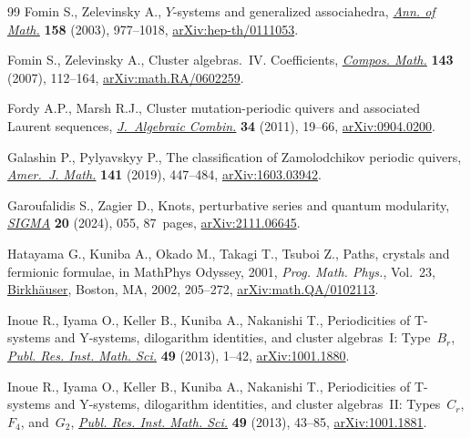 \begin{thebibliography}{99}
Fomin S., Zelevinsky A., {$Y$}-systems and generalized associahedra,
 \href{https://doi.org/10.4007/annals.2003.158.977}{\textit{Ann. of Math.}}
 \textbf{158} (2003), 977--1018,
 \href{http://arxiv.org/abs/hep-th/0111053}{arXiv:hep-th/0111053}.

Fomin S., Zelevinsky A., Cluster algebras.~{IV}. {C}oefficients,
 \href{https://doi.org/10.1112/S0010437X06002521}{\textit{Compos. Math.}}
 \textbf{143} (2007), 112--164,
 \href{http://arxiv.org/abs/math.RA/0602259}{arXiv:math.RA/0602259}.

Fordy A.P., Marsh R.J., Cluster mutation-periodic quivers and associated
 {L}aurent sequences,
 \href{https://doi.org/10.1007/s10801-010-0262-4}{\textit{J.~Algebraic
 Combin.}} \textbf{34} (2011), 19--66,
 \href{http://arxiv.org/abs/0904.0200}{arXiv:0904.0200}.

Galashin P., Pylyavskyy P., The classification of {Z}amolodchikov periodic
 quivers, \href{https://doi.org/10.1353/ajm.2019.0010}{\textit{Amer.~J.
 Math.}} \textbf{141} (2019), 447--484,
 \href{http://arxiv.org/abs/1603.03942}{arXiv:1603.03942}.

Garoufalidis S., Zagier D., Knots, perturbative series and quantum modularity,
 \href{https://doi.org/10.3842/SIGMA.2024.055}{\textit{SIGMA}} \textbf{20}
 (2024), 055, 87~pages,
 \href{http://arxiv.org/abs/2111.06645}{arXiv:2111.06645}.

Hatayama G., Kuniba A., Okado M., Takagi T., Tsuboi Z., Paths, crystals and
 fermionic formulae, in Math{P}hys {O}dyssey, 2001, \textit{Prog. Math.
 Phys.}, Vol.~23,
 \href{https://doi.org/10.1007/978-1-4612-0087-1_9}{Birkh\"auser}, Boston, MA,
 2002, 205--272,
 \href{http://arxiv.org/abs/math.QA/0102113}{arXiv:math.QA/0102113}.

Inoue R., Iyama O., Keller B., Kuniba A., Nakanishi T., Periodicities of
 {T}-systems and {Y}-systems, dilogarithm identities, and cluster
 algebras~{I}: {T}ype~{$B_r$},
 \href{https://doi.org/10.4171/PRIMS/95}{\textit{Publ. Res. Inst. Math. Sci.}}
 \textbf{49} (2013), 1--42,
 \href{http://arxiv.org/abs/1001.1880}{arXiv:1001.1880}.

Inoue R., Iyama O., Keller B., Kuniba A., Nakanishi T., Periodicities of
 {T}-systems and {Y}-systems, dilogarithm identities, and cluster
 algebras~{II}: {T}ypes~{$C_r$}, {$F_4$}, and~{$G_2$},
 \href{https://doi.org/10.4171/PRIMS/96}{\textit{Publ. Res. Inst. Math. Sci.}}
 \textbf{49} (2013), 43--85,
 \href{http://arxiv.org/abs/1001.1881}{arXiv:1001.1881}.


\end{thebibliography}
